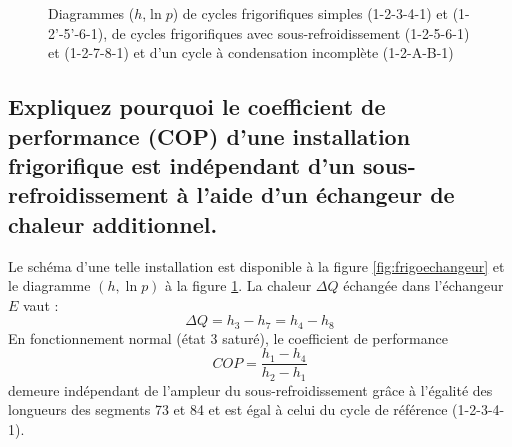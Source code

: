 \begin{figure}[p]\centering
    \caption{Diagrammes ($h$,$\ln p$) de cycles frigorifiques simples (1-2-3-4-1) et (1-2'-5'-6-1), de cycles frigorifiques avec sous-refroidissement (1-2-5-6-1) et (1-2-7-8-1) et d'un cycle à condensation incomplète (1-2-A-B-1)}
    \label{fig:sousrefroid}
\end{figure}

\subsection{Expliquez pourquoi le coefficient de performance (COP) d'une installation frigorifique est indépendant d'un sous-refroidissement à l'aide d'un échangeur de chaleur additionnel.}
Le schéma d'une telle installation est disponible à la figure \ref{fig:frigoechangeur} et le diagramme $(h,\ln p)$ à la figure \ref{fig:sousrefroid}. La chaleur $\Delta Q$ échangée dans l'échangeur $E$ vaut :
\begin{equation} \Delta Q = h_3 - h_7 = h_4-h_8 \end{equation}
En fonctionnement normal (état 3 saturé), le coefficient de performance 
\begin{equation} COP = \frac{h_1-h_4}{h_2-h_1} \end{equation}
demeure indépendant de l'ampleur du sous-refroidissement grâce à l'égalité des longueurs des segments 73 et 84 et est égal à celui du cycle de référence (1-2-3-4-1).

